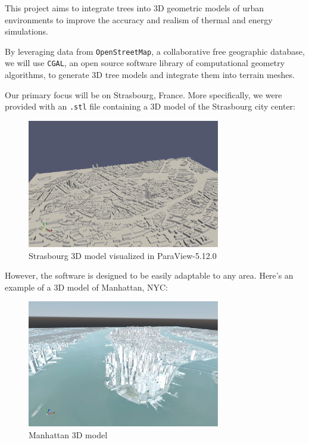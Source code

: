 \documentclass[12pt]{article}
\begin{document}
This project aims to integrate trees into 3D geometric models of urban
environments to improve the accuracy and realism of thermal and energy
simulations.

By leveraging data from \texttt{OpenStreetMap}\cite{openstreetmap}, a
collaborative free geographic database, we will use \texttt{CGAL}\cite{cgal},
an open source software library of computational geometry algorithms,
to generate 3D tree models and integrate them into terrain meshes.

Our primary focus will be on Strasbourg, France. More specifically, we were
provided with an \texttt{.stl}\cite{stl} file containing a 3D model of the
Strasbourg city center:

\begin{figure}[H]
    \centering
    \includegraphics[width=0.75\textwidth]{images/stras_mesh.png}
    \caption{Strasbourg 3D model visualized in ParaView-5.12.0\cite{paraview}}
\end{figure}

However, the software is designed to be easily adaptable to any area.
Here's an example of a 3D model of Manhattan, NYC:

\begin{figure}[H]
    \centering
    \includegraphics[width=0.75\textwidth]{images/manhattan_mesh.png}
    \caption{Manhattan 3D model}
\end{figure}
\end{document}
